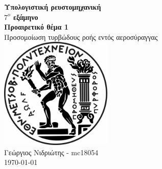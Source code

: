 \begin{center}
    \vspace{4cm}
    \huge
    \textbf{Υπολογιστική ρευστομηχανική}\\
    \textbf{ {$7^o$} εξάμηνο} \\
    \vspace{1cm}
    \LARGE
    \textbf{Προαιρετικό θέμα 1}\\
    \vspace{0.5cm}
    \LARGE
    Προσομοίωση τυρβώδους ροής εντός αεροσύραγγας     \vfill
    \includegraphics[width=0.4\textwidth]{pyrforos_bw.jpg}\\
    \vspace{4cm}
    \Large
    Γεώργιος Νιδριώτης  - mc18054\\

    \today
    \vspace{2cm}
\end{center}
